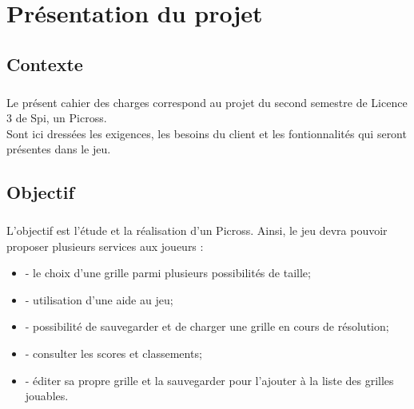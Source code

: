 
\newcommand{\titre}{Cahier des charges}



	\maketitle



\chapter{Présentation du projet}


\section{Contexte}
\paragraph*{}
Le présent cahier des charges correspond au projet du second semestre de Licence 3 de Spi, un Picross.\\
Sont ici dressées les exigences, les besoins du client et les fontionnalités qui seront présentes dans le jeu.


\section{Objectif}
\paragraph*{}
L'objectif est l'étude et la réalisation d'un Picross. Ainsi, le jeu devra pouvoir proposer plusieurs services aux joueurs :
\begin{itemize}
\item - le choix d'une grille parmi plusieurs possibilités de taille;
\item - utilisation d'une aide au jeu;
\item - possibilité de sauvegarder et de charger une grille en cours de résolution;
\item - consulter les scores et classements;
\item - éditer sa propre grille et la sauvegarder pour l'ajouter à la liste des grilles jouables.
\end{itemize}


